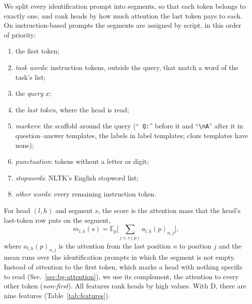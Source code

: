 \documentclass[10pt,a4paper]{article}
\newcommand{\nl}{\textbackslash n}
\newcommand{\p}[1]{``\texttt{#1}''}
\begin{document}
We split every identification prompt into segments, so that each token belongs to exactly one, and rank heads by how much attention the last token pays to each. On instruction-based prompts the segments are assigned by script, in this order of priority:
\begin{enumerate}
\item the first token;
\item \emph{task words}: instruction tokens, outside the query, that match a word of the task's list;
\item the \emph{query} $x$;
\item the \emph{last token}, where the head is read;
\item \emph{markers}: the scaffold around the query (\p{ Q:} before it and \p{\nl A} after it in question--answer templates, the labels in label templates; cloze templates have none);
\item \emph{punctuation}: tokens without a letter or digit;
\item \emph{stopwords}: NLTK's English stopword list;
\item \emph{other words}: every remaining instruction token.
\end{enumerate}
For head $(l,h)$ and segment $s$, the score is the attention mass that the head's last-token row puts on the segment,
\begin{equation}
m_{l,h}(s) = \mathbb{E}_{p}\Big[\sum_{j\in s(p)} a_{l,h}(p)_{n,j}\Big],
\end{equation}
where $a_{l,h}(p)_{n,j}$ is the attention from the last position $n$ to position $j$ and the mean runs over the identification prompts in which the segment is not empty. Instead of attention to the first token, which marks a head with nothing specific to read (Sec.~\ref{sec:bg-attention}), we use its complement, the attention to every other token (\emph{non-first}). All features rank heads by high values. With D, there are nine features (Table~\ref{tab:features}).
\end{document}
